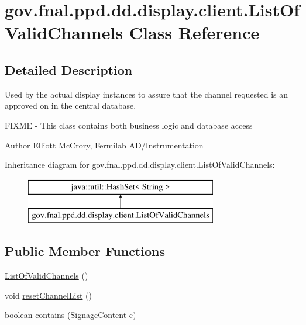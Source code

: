 \hypertarget{classgov_1_1fnal_1_1ppd_1_1dd_1_1display_1_1client_1_1ListOfValidChannels}{\section{gov.\-fnal.\-ppd.\-dd.\-display.\-client.\-List\-Of\-Valid\-Channels Class Reference}
\label{classgov_1_1fnal_1_1ppd_1_1dd_1_1display_1_1client_1_1ListOfValidChannels}
}


\subsection{Detailed Description}
Used by the actual display instances to assure that the channel requested is an approved on in the central database.

F\-I\-X\-M\-E -\/ This class contains both business logic and database access

\begin{DoxyAuthor}{Author}
Elliott Mc\-Crory, Fermilab A\-D/\-Instrumentation 
\end{DoxyAuthor}
Inheritance diagram for gov.\-fnal.\-ppd.\-dd.\-display.\-client.\-List\-Of\-Valid\-Channels\-:\begin{figure}[H]
\begin{center}
\leavevmode
\includegraphics[height=2.000000cm]{classgov_1_1fnal_1_1ppd_1_1dd_1_1display_1_1client_1_1ListOfValidChannels}
\end{center}
\end{figure}
\subsection*{Public Member Functions}
\begin{DoxyCompactItemize}
\item 
\hyperlink{classgov_1_1fnal_1_1ppd_1_1dd_1_1display_1_1client_1_1ListOfValidChannels_a32b06c35045255ed512433f0a9c3d115}{List\-Of\-Valid\-Channels} ()
\item 
void \hyperlink{classgov_1_1fnal_1_1ppd_1_1dd_1_1display_1_1client_1_1ListOfValidChannels_ac7e8b27fed18f295c739273b25cc16f3}{reset\-Channel\-List} ()
\item 
boolean \hyperlink{classgov_1_1fnal_1_1ppd_1_1dd_1_1display_1_1client_1_1ListOfValidChannels_a46ab473927c0c932b8465dd400e5058b}{contains} (\hyperlink{interfacegov_1_1fnal_1_1ppd_1_1dd_1_1signage_1_1SignageContent}{Signage\-Content} c)
\end{DoxyCompactItemize}


